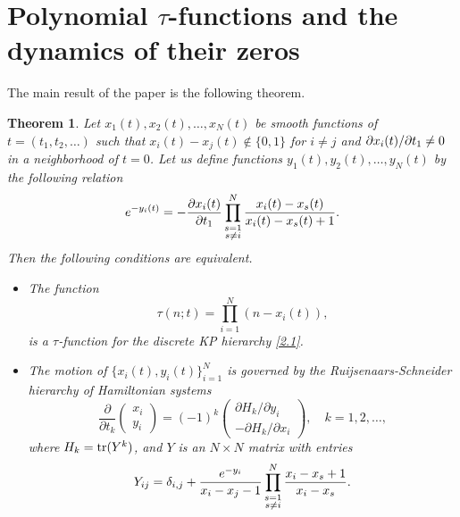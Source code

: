 \documentclass[11pt,reqno]{amsart}
\newtheorem{Theorem}{Theorem}[section]
\theoremstyle{definition}
\numberwithin{equation}{section}
\begin{document}
\section{Polynomial $\tau$-functions and the dynamics of their zeros}
                                                                 \label{se3}

The main result of the paper is the following theorem.

\begin{Theorem}\label{th3.1}
Let $x_{1}(t),x_{2}(t),\dots, x_{N}(t)$ be smooth functions of 
$t=(t_1,t_2,\dots)$ such that $x_i(t)-x_j(t)\notin\{0,1\}$ for $i\neq j$ 
and $\partial x_i(t)/\partial t_1\neq 0$ in a neighborhood of $t=0$. 
Let us define functions $y_1(t),y_2(t),\dots,y_N(t)$ by the following 
relation
\begin{equation}                                                \label{3.1}
e^{-y_i(t)}=-\frac{\partial x_i(t)}{\partial t_1}
\prod_{\begin{subarray}{c}s=1 \\s\neq i\end{subarray}}^N
\frac{x_i(t)-x_s(t)}{x_i(t)-x_s(t)+1}.
\end{equation}
Then the following conditions are equivalent.
\begin{itemize}
\item[(i)] The function 
\begin{equation}                                                \label{3.2}
\tau(n;t)=\prod_{i=1}^N(n-x_i(t)),
\end{equation}
is a $\tau$-function for the discrete KP hierarchy \eqref{2.1}. 
\item[(ii)] The motion of $\{x_i(t),y_i(t)\}_{i=1}^N$ is governed by 
the Ruijsenaars-Schneider hierarchy of Hamiltonian systems
\begin{equation}                                                \label{3.3}
\frac{\partial }{\partial t_k}
\left(\begin{array}{c} x_i \\y_i\end{array}\right) = (-1)^k
\left(\begin{array}{c}
\partial H_k /\partial y_i \\-\partial H_k /\partial x_i
\end{array} 
\right),\quad k=1,2,\dots,
\end{equation}
where $H_k=\mathrm{tr}(Y^{k})$, and $Y$ is an $N\times N$ matrix with entries
\begin{equation}                                                \label{3.4}
Y_{ij}=\delta_{i,j}+\frac{e^{-y_i}}{x_i-x_j-1}
\prod_{\begin{subarray}{c}s=1 \\s\neq i\end{subarray}}^N
\frac{x_i-x_s+1}{x_i-x_s}.
\end{equation}
\end{itemize}
\end{Theorem}
\end{document}
